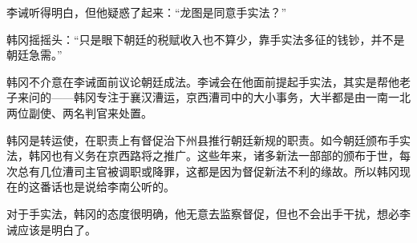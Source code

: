 李诫听得明白，但他疑惑了起来：“龙图是同意手实法？”

韩冈摇摇头：“只是眼下朝廷的税赋收入也不算少，靠手实法多征的钱钞，并不是朝廷急需。”

韩冈不介意在李诫面前议论朝廷成法。李诫会在他面前提起手实法，其实是帮他老子来问的——韩冈专注于襄汉漕运，京西漕司中的大小事务，大半都是由一南一北两位副使、两名判官来处置。

韩冈是转运使，在职责上有督促治下州县推行朝廷新规的职责。如今朝廷颁布手实法，韩冈也有义务在京西路将之推广。这些年来，诸多新法一部部的颁布于世，每次总有几位漕司主官被调职或降罪，这都是因为督促新法不利的缘故。所以韩冈现在的这番话也是说给李南公听的。

对于手实法，韩冈的态度很明确，他无意去监察督促，但也不会出手干扰，想必李诫应该是明白了。

